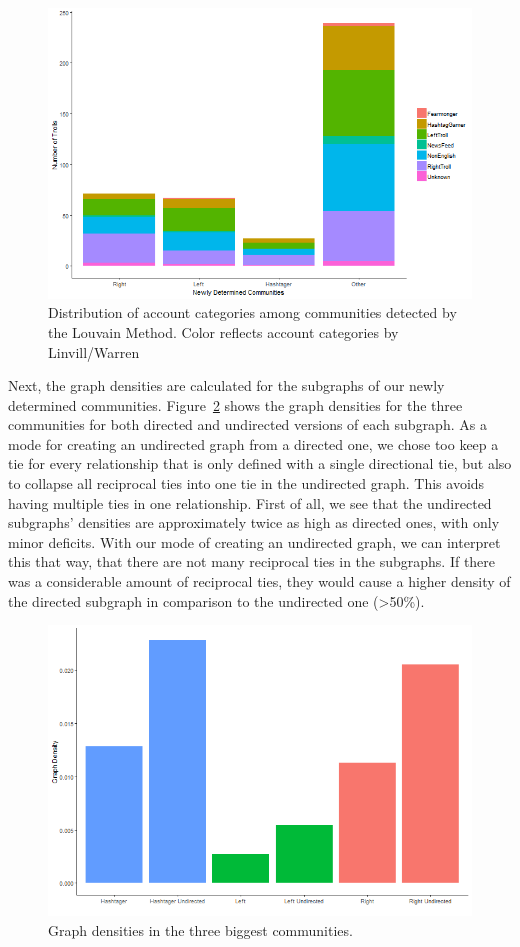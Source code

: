 \documentclass[12pt, titlepage=true, toc=bib]{scrartcl}
\begin{document}
\begin{figure}[!ht]
\centering
\includegraphics[width=0.95\linewidth]{figure2.png}%
\caption{Distribution of account categories among communities detected by the Louvain Method. Color reflects account categories by Linvill/Warren}
\label{fig:distcat}
\end{figure}

Next, the graph densities are calculated for the subgraphs of our newly determined communities. Figure~\ref{fig:dens} shows the graph densities for the three communities for both directed and undirected versions of each subgraph. As a mode for creating an undirected graph from a directed one, we chose too keep a tie for every relationship that is only defined with a single directional tie, but also to collapse all reciprocal ties into one tie in the undirected graph. This avoids having multiple ties in one relationship. First of all, we see that the undirected subgraphs' densities are approximately twice as high as directed ones, with only minor deficits. With our mode of creating an undirected graph, we can interpret this that way, that there are not many reciprocal ties in the subgraphs. If there was a considerable amount of reciprocal ties, they would cause a higher density of the directed subgraph in comparison to the undirected one (>50\%).

\begin{figure}[!ht]
\centering
\includegraphics[width=0.95\linewidth]{figure3.png}
\caption{Graph densities in the three biggest communities.}
\label{fig:dens}
\end{figure}
\end{document}
